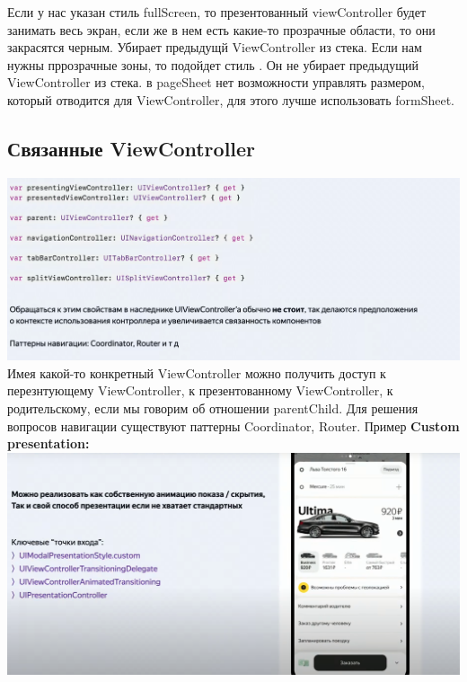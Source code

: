 \documentclass{article}
\begin{document}
    \newline
    Если у нас указан стиль fullScreen, то презентованный viewController будет занимать весь экран, если же в нем есть какие-то прозрачные области, то они закрасятся черным. Убирает предыдущй ViewController из стека.
    \newline
    Если нам нужны пррозрачные зоны, то подойдет стиль . Он не убирает предыдущий ViewController из стека. 
    \newline
    в pageSheet нет возможности управлять размером, который отводится для ViewController, для этого лучше использовать formSheet.
    \subsection{Связанные ViewController}
    \includegraphics[scale = 0.5]{pic/Снимок экрана 2023-08-03 в 19.38.15.png}
    \newline
    Имея какой-то конкретный ViewController можно получить доступ к перезнтующему ViewController, к презентованному ViewController, к родительскому, если мы говорим об отношении parentChild. Для решения вопросов навигации существуют паттерны Coordinator, Router. 
    \newline
    Пример \textbf{Custom presentation:}
    \newline
    \includegraphics[scale = 0.5]{pic/Снимок экрана 2023-08-03 в 19.41.14.png}
\end{document}
